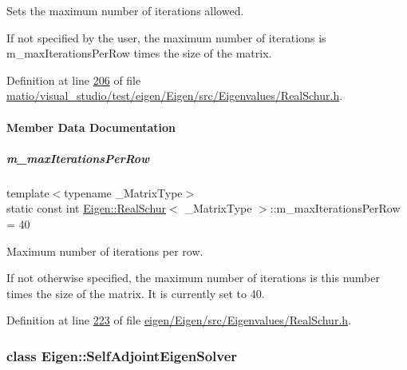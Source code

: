 Sets the maximum number of iterations allowed. 

If not specified by the user, the maximum number of iterations is m\+\_\+max\+Iterations\+Per\+Row times the size of the matrix. 

Definition at line \hyperlink{matio_2visual__studio_2test_2eigen_2_eigen_2src_2_eigenvalues_2_real_schur_8h_source_l00206}{206} of file \hyperlink{matio_2visual__studio_2test_2eigen_2_eigen_2src_2_eigenvalues_2_real_schur_8h_source}{matio/visual\+\_\+studio/test/eigen/\+Eigen/src/\+Eigenvalues/\+Real\+Schur.\+h}.



\paragraph{Member Data Documentation}
\mbox{\label{group___eigenvalues___module_ab42163ff22cd3ad98aa2bde39b4bbc79}} 
\subparagraph{\texorpdfstring{m\+\_\+max\+Iterations\+Per\+Row}{m\_maxIterationsPerRow}}
{\footnotesize\ttfamily template$<$typename \+\_\+\+Matrix\+Type$>$ \\
static const int \hyperlink{group___eigenvalues___module_class_eigen_1_1_real_schur}{Eigen\+::\+Real\+Schur}$<$ \+\_\+\+Matrix\+Type $>$\+::m\+\_\+max\+Iterations\+Per\+Row = 40\hspace{0.3cm}{\ttfamily [static]}}



Maximum number of iterations per row. 

If not otherwise specified, the maximum number of iterations is this number times the size of the matrix. It is currently set to 40. 

Definition at line \hyperlink{eigen_2_eigen_2src_2_eigenvalues_2_real_schur_8h_source_l00223}{223} of file \hyperlink{eigen_2_eigen_2src_2_eigenvalues_2_real_schur_8h_source}{eigen/\+Eigen/src/\+Eigenvalues/\+Real\+Schur.\+h}.

\label{class_eigen_1_1_self_adjoint_eigen_solver}
\subsubsection{class Eigen\+:\+:Self\+Adjoint\+Eigen\+Solver}

